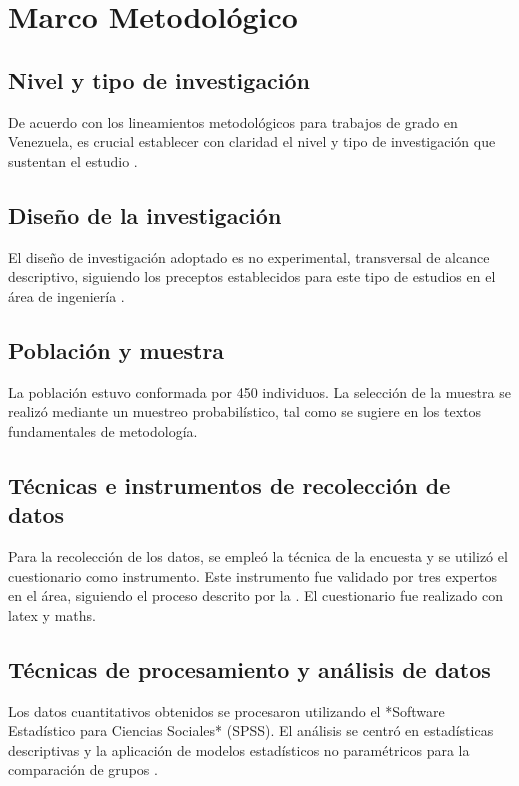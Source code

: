 \chapter{Marco Metodológico}

\section{Nivel y tipo de investigación}
\lipsum[18]
De acuerdo con los lineamientos metodológicos para trabajos de grado en Venezuela, es crucial establecer con claridad el nivel y tipo de investigación que sustentan el estudio \autocite{book:hernandez2014}.

\section{Diseño de la investigación}
\lipsum[19]
El diseño de investigación adoptado es no experimental, transversal de alcance descriptivo, siguiendo los preceptos establecidos para este tipo de estudios en el área de ingeniería \parencite{book:hernandez2014}.

\section{Población y muestra}
\lipsum[20]
La población estuvo conformada por 450 individuos. La selección de la muestra se realizó mediante un muestreo probabilístico, tal como se sugiere en los textos fundamentales de metodología.

\section{Técnicas e instrumentos de recolección de datos}
\lipsum[21]
Para la recolección de los datos, se empleó la técnica de la encuesta y se utilizó el cuestionario como instrumento. Este instrumento fue validado por tres expertos en el área, siguiendo el proceso descrito por la \textcite{online:unefa2022}. El cuestionario fue realizado con \Gls{latex} y \gls{maths}.

\section{Técnicas de procesamiento y análisis de datos}
\lipsum[22]
Los datos cuantitativos obtenidos se procesaron utilizando el *Software Estadístico para Ciencias Sociales* (SPSS). El análisis se centró en estadísticas descriptivas y la aplicación de modelos estadísticos no paramétricos para la comparación de grupos \parencite{article:perez2020}.

